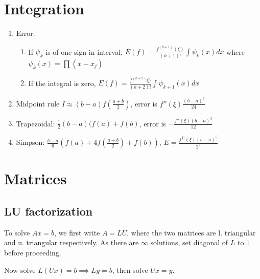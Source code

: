 \documentclass[12pt]{article}
\begin{document}
\section{Integration}
\begin{enumerate}
\item Error: \begin{enumerate}
\item  If $\psi_k$ is of one sign in interval, $E(f)=\frac{f^{(k+1)}(\xi)}{(k+1)!}\int \psi_k(x)dx$ where $\psi_k(x)=\prod (x-x_j)$
\item If the integral is zero,  $E(f)=\frac{f^{(k+2)}\xi)}{(k+2)!}\int \psi_{k+1}(x)dx$
\end{enumerate}
\item Midpoint rule $I \approx (b-a)f\left(\frac{a+b}{2}\right)$, error is $f''(\xi)\frac{(b-a)^3}{24}$
\item Trapezoidal: $\frac12(b-a)(f(a)+f(b)$, error is $-\frac{f''(\xi)(b-a)^3}{12}$
\item  Simpson: $\frac{b-a}{6}\left(f(a)+4f\left(\frac{a+b}{2}\right)+f(b)\right)$, $E=\frac{f^{4)}(\xi)(b-a)^5}{2^5}$
\end{enumerate}

\section{Matrices}
\subsection{LU factorization}
To solve $Ax=b$, we first write $A=LU$, where the two matrices are l. triangular and u. triangular respectively. As there are $\infty$ solutions, set diagonal of $L$ to $1$ before proceeding.

Now solve $L(Ux)=b\implies Ly=b$, then solve $Ux=y$.
\end{document}
